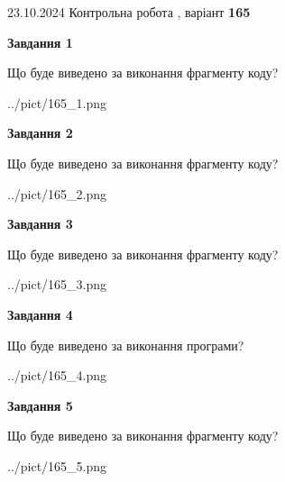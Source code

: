 \documentclass[12pt, ukrainian]{article}
\begin{document}
{\Large{23.10.2024 Контрольна робота , варіант  \No \textbf { 165 }\par}}
{
\begin {large}
{\begin {center}\textbf{Завдання 1}\end {center}}

Що буде виведено за виконання фрагменту коду?\par
\begin{center}
	{../pict/165_1.png}
\end{center}
\newpage

{\begin {center}\textbf{Завдання 2}\end {center}}

Що буде виведено за виконання фрагменту коду?\par
\begin{center}
	{../pict/165_2.png}
\end{center}
\newpage

{\begin {center}\textbf{Завдання 3}\end {center}}

Що буде виведено за виконання фрагменту коду?\par
\begin{center}
	{../pict/165_3.png}
\end{center}
\newpage

{\begin {center}\textbf{Завдання 4}\end {center}}

Що буде виведено за виконання програми?\par
\begin{center}
	{../pict/165_4.png}
\end{center}
\newpage

{\begin {center}\textbf{Завдання 5}\end {center}}

Що буде виведено за виконання фрагменту коду?\par
\begin{center}
	{../pict/165_5.png}
\end{center}
\newpage


\end{large}}
\end{document}
